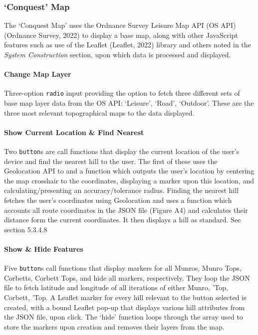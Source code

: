 \documentclass[11pt, english]{article}
\begin{document}
		\subsubsection{`Conquest' Map}

	The `Conquest Map' uses the Ordnance Survey Leisure Map API (OS API) (Ordnance Survey, 2022) to display a base map, along with other JavaScript features such as use of the Leaflet (Leaflet, 2022) library and others noted in the \textit{System Construction} section, upon which data is processed and displayed.

			\paragraph{Change Map Layer}

	Three-option \texttt{radio} input providing the option to fetch three different sets of base map layer data from the OS API: `Leisure', `Road', `Outdoor'. These are the three most relevant topographical maps to the data displayed.

			\paragraph{Show Current Location \& Find Nearest}

	Two \texttt{button}s are call functions that display the current location of the user's device and find the nearest hill to the user. The first of these uses the Geolocation API to and a function which outputs the user's location by centering the map crosshair to the coordinates, displaying a marker upon this location, and calculating/presenting an accuracy/tolerance radius. Finding the nearest hill fetches the user's coordinates using Geolocation and uses a function which accounts all route coordinates in the JSON file (Figure A4) and calculates their distance form the current coordinates. It then displays a hill as standard. See section 5.3.4.8

			\paragraph{Show \& Hide Features}

	Five \texttt{button}s call functions that display markers for all Munros, Munro Tops, Corbetts, Corbett Tops, and hide all markers, respectively. They loop the JSON file to fetch latitude and longitude of all iterations of either Munro, 'Top, Corbett, 'Top. A Leaflet marker for every hill relevant to the button selected is created, with a bound Leaflet pop-up that displays various hill attributes from the JSON file, upon click. The `hide' function loops through the array used to store the markers upon creation and removes their layers from the map.
\end{document}
